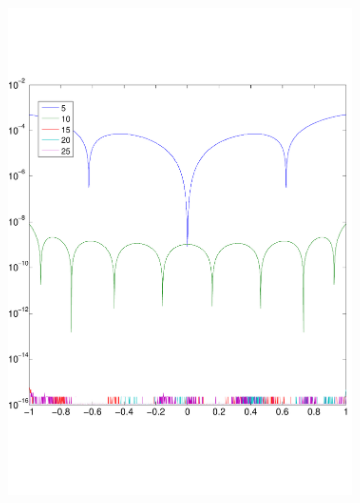 \documentclass[a4paper, 12pt, titlepage]{report}
\begin{document}
\begin{figure}
\begin{subfigure}{0.5\textwidth}
 \includegraphics[width=\textwidth]{errorCos2.pdf}
 \end{subfigure}
 


\end{figure}
\end{document}

